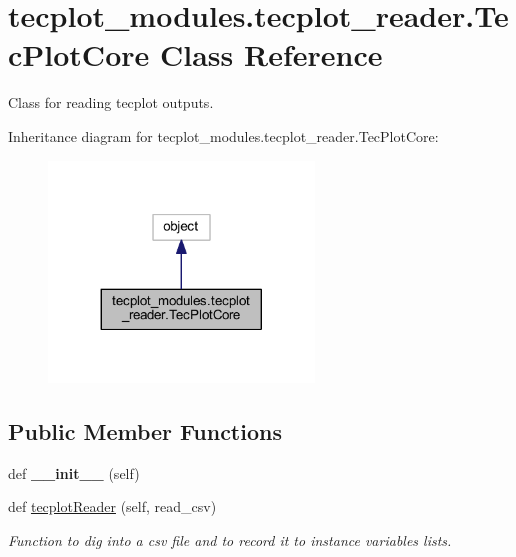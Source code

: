 \hypertarget{a00119}{}\section{tecplot\+\_\+modules.\+tecplot\+\_\+reader.\+Tec\+Plot\+Core Class Reference}
\label{a00119}


Class for reading tecplot outputs.  




Inheritance diagram for tecplot\+\_\+modules.\+tecplot\+\_\+reader.\+Tec\+Plot\+Core\+:
\nopagebreak
\begin{figure}[H]
\begin{center}
\leavevmode
\includegraphics[width=200pt]{a00118}
\end{center}
\end{figure}
\subsection*{Public Member Functions}
\begin{DoxyCompactItemize}
\item 
\hypertarget{a00119_a15954180c0b4a9677efd980873a91773}{}\label{a00119_a15954180c0b4a9677efd980873a91773} 
def {\bfseries \+\_\+\+\_\+init\+\_\+\+\_\+} (self)
\item 
def \hyperlink{a00119_a9cf438934b57cd1d0bef90bcc00f27ac}{tecplot\+Reader} (self, read\+\_\+csv)
\begin{DoxyCompactList}\small\item\em Function to dig into a csv file and to record it to instance variables lists. \end{DoxyCompactList}\end{DoxyCompactItemize}
